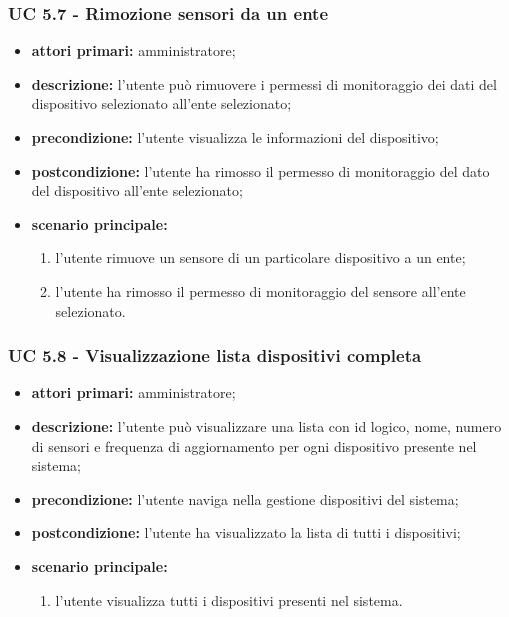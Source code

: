 			\subsubsection{UC 5.7 - Rimozione sensori da un ente}
			\begin{itemize}
				\item \textbf{attori primari:} amministratore;
				\item \textbf{descrizione:} l'utente può rimuovere i permessi di monitoraggio dei dati del dispositivo selezionato all'ente selezionato;
				\item \textbf{precondizione:} l'utente visualizza le informazioni del dispositivo;
				\item \textbf{postcondizione:} l'utente ha rimosso il permesso di monitoraggio del dato del dispositivo all'ente selezionato;
				\item \textbf{scenario principale:}
				\begin{enumerate}
					\item{l'utente rimuove un sensore di un particolare dispositivo a un ente;}
					\item{l'utente ha rimosso il permesso di monitoraggio del sensore all'ente selezionato.}
				\end{enumerate}
			\end{itemize}

			\subsubsection{UC 5.8 - Visualizzazione lista dispositivi completa}
			\begin{itemize}
				\item \textbf{attori primari:} amministratore;
				\item \textbf{descrizione:} l'utente può visualizzare una lista con id logico, nome, numero di sensori e frequenza di aggiornamento per ogni dispositivo presente nel sistema;
				\item \textbf{precondizione:} l'utente naviga nella gestione dispositivi del sistema;
				\item \textbf{postcondizione:} l'utente ha visualizzato la lista di tutti i dispositivi;
				\item \textbf{scenario principale:}
				\begin{enumerate}
					\item{l'utente visualizza tutti i dispositivi presenti nel sistema.}
				\end{enumerate}
			\end{itemize}

